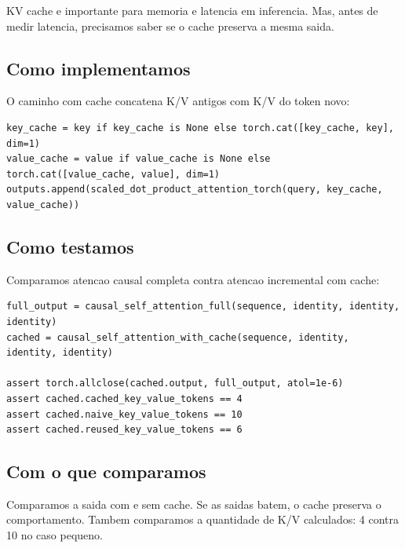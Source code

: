 KV cache e importante para memoria e latencia em inferencia. Mas, antes de medir latencia, precisamos saber se o cache preserva a mesma saida.



\subsection{Como implementamos}



O caminho com cache concatena K/V antigos com K/V do token novo:



\begin{Verbatim}[fontsize=\small,breaklines=true,label=python]
key_cache = key if key_cache is None else torch.cat([key_cache, key], dim=1)
value_cache = value if value_cache is None else torch.cat([value_cache, value], dim=1)
outputs.append(scaled_dot_product_attention_torch(query, key_cache, value_cache))
\end{Verbatim}



\subsection{Como testamos}



Comparamos atencao causal completa contra atencao incremental com cache:



\begin{Verbatim}[fontsize=\small,breaklines=true,label=python]
full_output = causal_self_attention_full(sequence, identity, identity, identity)
cached = causal_self_attention_with_cache(sequence, identity, identity, identity)

assert torch.allclose(cached.output, full_output, atol=1e-6)
assert cached.cached_key_value_tokens == 4
assert cached.naive_key_value_tokens == 10
assert cached.reused_key_value_tokens == 6
\end{Verbatim}



\subsection{Com o que comparamos}





Comparamos a saida com e sem cache. Se as saidas batem, o cache preserva o comportamento. Tambem comparamos a quantidade de K/V calculados: 4 contra 10 no caso pequeno.



